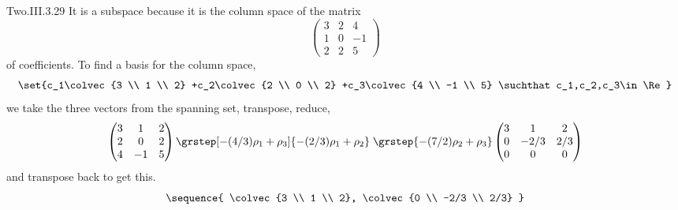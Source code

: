 \begin{ans}{Two.III.3.29}
      It is a subspace because it is the column space of the matrix
      \begin{equation*}
        \begin{pmatrix}
          3  &2  &4  \\
          1  &0  &-1 \\
          2  &2  &5
        \end{pmatrix}
      \end{equation*}
      of coefficients.
      To find a basis for the column space,
      \begin{equation*}
        \set{c_1\colvec{3 \\ 1 \\ 2}
             +c_2\colvec{2 \\ 0 \\ 2}
             +c_3\colvec{4 \\ -1 \\ 5}
             \suchthat c_1,c_2,c_3\in\Re}
      \end{equation*}
      we take the three vectors from the spanning set, transpose, reduce,
      \begin{equation*}
         \begin{pmatrix}
           3  &1  &2  \\
           2  &0  &2  \\
           4  &-1 &5
         \end{pmatrix}
         \grstep[-(4/3)\rho_1+\rho_3]{-(2/3)\rho_1+\rho_2}
         \;\grstep{-(7/2)\rho_2+\rho_3}
         \begin{pmatrix}
           3  &1     &2  \\
           0  &-2/3  &2/3  \\
           0  &0     &0
         \end{pmatrix}
      \end{equation*}
      and transpose back to get this.
      \begin{equation*}
        \sequence{ \colvec{3 \\ 1 \\ 2},
                   \colvec{0 \\ -2/3 \\ 2/3}  }
      \end{equation*}
    
\end{ans}
